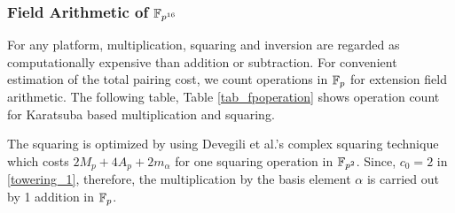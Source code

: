 \subsubsection{Field Arithmetic  of \texorpdfstring{$\FPSN$}{}}
For any platform, multiplication, squaring and inversion are regarded as computationally expensive than addition or subtraction. 
For convenient estimation of the total pairing cost, we count operations in ${\mathbb{F}}_{p}$ for extension field arithmetic.
The following table, Table \ref{tab_fpoperation} shows operation count for Karatsuba based multiplication and squaring.
\renewcommand{\baselinestretch}{1.5}
\begin{table}[ht]
	\centering
	\caption{Number of arithmetic operations in  $\FPSN$ based on Type-I towering \eqref{towering_1}.}
	\label{tab_fpoperation}
\end{table}
\renewcommand{\baselinestretch}{1.0}
The squaring is optimized by using Devegili et al.'s \cite{EPRINT:DOSD06} complex squaring technique which costs $2M_p+4A_p+2m_\alpha$ for one squaring operation in $\mathbb{F}_{p^2}$. 
Since, $c_0=2$ in \eqref{towering_1}, therefore, the multiplication by the basis element $\alpha$ is carried out by 1 addition in ${\mathbb{F}}_{p}$.

